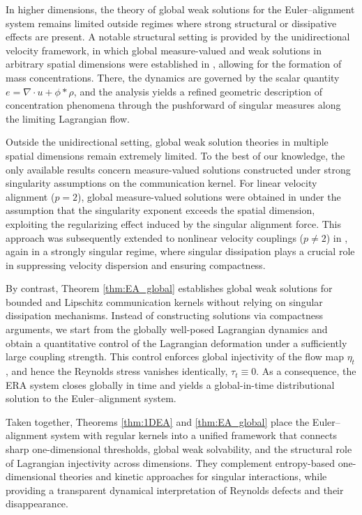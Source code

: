 \documentclass[10pt,reqno]{amsart}
\numberwithin{equation}{section}
\begin{document}
In higher dimensions, the theory of global weak solutions for the Euler--alignment system remains limited outside regimes where strong structural or dissipative effects are present. A notable structural setting is provided by the unidirectional velocity framework, in which global measure-valued and weak solutions in arbitrary spatial dimensions were established in \cite{LLST22}, allowing for the formation of mass concentrations. There, the dynamics are governed by the scalar quantity $e=\nabla \cdot u+\phi*\rho$, and the analysis yields a refined geometric description of concentration phenomena through the pushforward of singular measures along the limiting Lagrangian flow.

Outside the unidirectional setting, global weak solution theories in multiple spatial dimensions remain extremely limited. To the best of our knowledge, the only available results concern measure-valued solutions constructed under strong singularity assumptions on the communication kernel. For linear velocity alignment ($p=2$), global measure-valued solutions were obtained in \cite{FP24} under the assumption that the singularity exponent exceeds the spatial dimension, exploiting the regularizing effect induced by the singular alignment force. This approach was subsequently extended to nonlinear velocity couplings ($p\neq 2$) in \cite{CFP25}, again in a strongly singular regime, where singular dissipation plays a crucial role in suppressing velocity dispersion and ensuring compactness.
 
By contrast, Theorem \ref{thm:EA_global} establishes global weak solutions for bounded and Lipschitz communication kernels without relying on singular dissipation mechanisms. Instead of constructing solutions via compactness arguments, we start from the globally well-posed Lagrangian dynamics and obtain a quantitative control of the Lagrangian deformation under a sufficiently large coupling strength. This control enforces global injectivity of the flow map $\eta_t$, and hence the Reynolds stress vanishes identically, $\tau_t\equiv0$. As a consequence, the ERA system closes globally in time and yields a global-in-time distributional solution to the Euler--alignment system.

Taken together, Theorems \ref{thm:1DEA} and \ref{thm:EA_global} place the Euler--alignment system with regular kernels into a unified framework that connects sharp one-dimensional thresholds, global weak solvability, and the structural role of Lagrangian injectivity across dimensions. They complement entropy-based one-dimensional theories and kinetic approaches for singular interactions, while providing a transparent dynamical interpretation of Reynolds defects and their disappearance.
\end{document}
